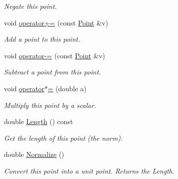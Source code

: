 \begin{DoxyCompactItemize}
\begin{DoxyCompactList}\small\item\em Negate this point. \end{DoxyCompactList}\item 
\hypertarget{structp2t_1_1_point_a114de25986403a4096c16332d388372d}{void \hyperlink{structp2t_1_1_point_a114de25986403a4096c16332d388372d}{operator+=} (const \hyperlink{structp2t_1_1_point}{Point} \&v)}\label{structp2t_1_1_point_a114de25986403a4096c16332d388372d}

\begin{DoxyCompactList}\small\item\em Add a point to this point. \end{DoxyCompactList}\item 
\hypertarget{structp2t_1_1_point_a7d22374466d39be1624a895648d1f980}{void \hyperlink{structp2t_1_1_point_a7d22374466d39be1624a895648d1f980}{operator-\/=} (const \hyperlink{structp2t_1_1_point}{Point} \&v)}\label{structp2t_1_1_point_a7d22374466d39be1624a895648d1f980}

\begin{DoxyCompactList}\small\item\em Subtract a point from this point. \end{DoxyCompactList}\item 
\hypertarget{structp2t_1_1_point_a833e141215999f1b467fbf2915240ed7}{void \hyperlink{structp2t_1_1_point_a833e141215999f1b467fbf2915240ed7}{operator$\ast$=} (double a)}\label{structp2t_1_1_point_a833e141215999f1b467fbf2915240ed7}

\begin{DoxyCompactList}\small\item\em Multiply this point by a scalar. \end{DoxyCompactList}\item 
\hypertarget{structp2t_1_1_point_a81ffb7fec4377c5e6a5a9b0d79143401}{double \hyperlink{structp2t_1_1_point_a81ffb7fec4377c5e6a5a9b0d79143401}{Length} () const }\label{structp2t_1_1_point_a81ffb7fec4377c5e6a5a9b0d79143401}

\begin{DoxyCompactList}\small\item\em Get the length of this point (the norm). \end{DoxyCompactList}\item 
\hypertarget{structp2t_1_1_point_ad8add2f6f3c4a220bc5741510701f9f7}{double \hyperlink{structp2t_1_1_point_ad8add2f6f3c4a220bc5741510701f9f7}{Normalize} ()}\label{structp2t_1_1_point_ad8add2f6f3c4a220bc5741510701f9f7}

\begin{DoxyCompactList}\small\item\em Convert this point into a unit point. Returns the Length. \end{DoxyCompactList}\end{DoxyCompactItemize}
